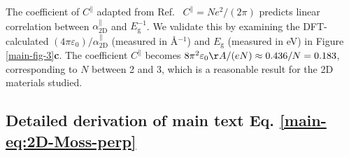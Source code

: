 \documentclass[manuscript=suppinfo,email=true,hyperref=true,keywords=false]{achemso}
\begin{document}
The coefficient of $C^{\parallel}$ adapted from
Ref.~ $C^{\parallel} = N e^{2}/(2\pi)$
predicts linear correlation between $\alpha^{\parallel}_{\mathrm{2D}}$
and $E_{\mathrm{g}}^{-1}$. We validate this by examining the
DFT-calculated
$(4\pi \varepsilon_{0})/\alpha^{\parallel}_{\mathrm{2D}}$ (measured in
\AA{}$^{-1}$) and $E_{\mathrm{g}}$ (measured in eV) in
Figure \ref{main-fig-3}\textbf{c}. The coefficient $C^{\parallel}$
becomes
$8 \pi^{2} \varepsilon_{0} \AA{} / (e N) \approx 0.436 / N = 0.183$,
corresponding to $N$ between 2 and 3, which is a reasonable result for
the 2D materials studied.



\subsection{Detailed derivation of main text Eq. \ref{main-eq:2D-Moss-perp}}
\label{ssec:theory-1-perp}
\end{document}
